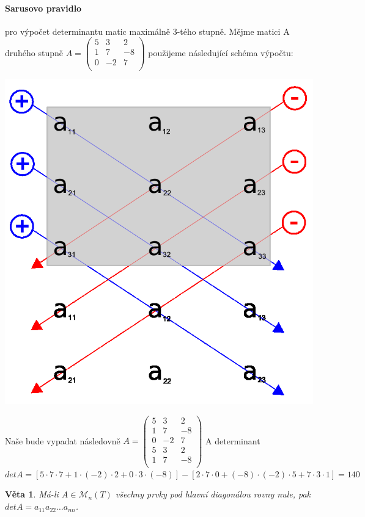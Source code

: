 \documentclass[12pt,a4paper]{article}
\newtheorem{sentence}{Věta}
\begin{document}
\paragraph{Sarusovo pravidlo} pro výpočet determinantu matic maximálně 3-tého stupně. Mějme matici A druhého stupně $A = \left( \begin{array}{ccc} 5 & 3 & 2\\ 1 & 7 & -8\\ 0 & -2 & 7\\ \end{array} \right)$ použijeme následující schéma výpočtu: 
\begin{center}
	\includegraphics[scale=0.2]{img/SarussRule}
\end{center}
Naše  bude vypadat následovně $A = \left( \begin{array}{ccc} 5 & 3 & 2\\ 1 & 7 & -8\\ 0 & -2 & 7\\ 5 & 3 & 2\\ 1 & 7 & -8\\ \end{array} \right)$ A determinant $detA = [5⋅7⋅7+1⋅(−2)⋅2+0⋅3⋅(−8)]−[2⋅7⋅0+(−8)⋅(−2)⋅5+7⋅3⋅1]=140$
\begin{sentence}
	Má-li $A \in \mathscr{M}_n(T)$ všechny prvky pod hlavní diagonálou rovny nule, pak $detA = a_{11}a_{22}\dots a_{nn}$. 
\end{sentence}
\end{document}
